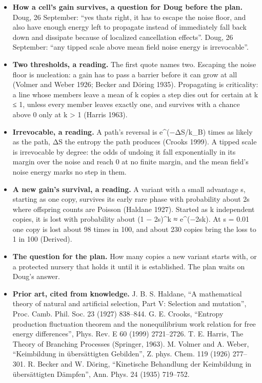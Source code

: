 \begin{enumerate}
\begin{itemize}
\begin{enumerate}
\begin{itemize}
\item \textbf{How a cell's gain survives, a question for Doug before the plan.} Doug, 26 September: “yes thats right, it has to escape the noise floor, and also have enough energy left to propagate instead of immediately fall back down and dissipate because of localized cancellation effects”. Doug, 26 September: “any tipped scale above mean field noise energy is irrevocable”.
\item \textbf{Two thresholds, a reading.} The first quote names two. Escaping the noise floor is nucleation: a gain has to pass a barrier before it can grow at all (Volmer and Weber 1926; Becker and Döring 1935). Propagating is criticality: a line whose members leave a mean of k copies a step dies out for certain at k ≤ 1, unless every member leaves exactly one, and survives with a chance above 0 only at k > 1 (Harris 1963).
\item \textbf{Irrevocable, a reading.} A path's reversal is e\textasciicircum{}(−ΔS/k\_\allowbreak{}B) times as likely as the path, ΔS the entropy the path produces (Crooks 1999). A tipped scale is irrevocable by degree: the odds of undoing it fall exponentially in its margin over the noise and reach 0 at no finite margin, and the mean field's noise energy marks no step in them.
\item \textbf{A new gain's survival, a reading.} A variant with a small advantage s, starting as one copy, survives its early rare phase with probability about 2s where offspring counts are Poisson (Haldane 1927). Started as k independent copies, it is lost with probability about (1 − 2s)\textasciicircum{}k ≈ e\textasciicircum{}(−2sk). At s = 0.01 one copy is lost about 98 times in 100, and about 230 copies bring the loss to 1 in 100 (Derived).
\item \textbf{The question for the plan.} How many copies a new variant starts with, or a protected nursery that holds it until it is established. The plan waits on Doug's answer.
\item \textbf{Prior art, cited from knowledge.} J. B. S. Haldane, “A mathematical theory of natural and artificial selection, Part V: Selection and mutation”, Proc. Camb. Phil. Soc. 23 (1927) 838–844. G. E. Crooks, “Entropy production fluctuation theorem and the nonequilibrium work relation for free energy differences”, Phys. Rev. E 60 (1999) 2721–2726. T. E. Harris, The Theory of Branching Processes (Springer, 1963). M. Volmer and A. Weber, “Keimbildung in übersättigten Gebilden”, Z. phys. Chem. 119 (1926) 277–301. R. Becker and W. Döring, “Kinetische Behandlung der Keimbildung in übersättigten Dämpfen”, Ann. Phys. 24 (1935) 719–752.

\end{itemize}
\end{enumerate}
\end{itemize}
\end{enumerate}
